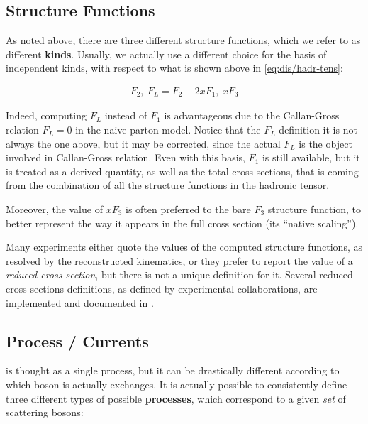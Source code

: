 \subsection{Structure Functions}

As noted above, there are three different structure functions, which we refer
to as different \textbf{kinds}.
Usually, we actually use a different choice for the basis of independent kinds,
with respect to what is shown above in \cref{eq:dis/hadr-tens}:

\begin{align}
    F_2,~ F_L = F_2 - 2xF_1,~ xF_3
\end{align}

Indeed, computing $F_L$ instead of $F_1$ is advantageous due to the Callan-Gross
relation \cite{Callan:1969uq} $F_L=0$ in the naive parton model.
Notice that the $F_L$ definition it is not always the one above, but it may be
corrected, since the actual $F_L$ is the object involved in Callan-Gross
relation.
%
Even with this basis, $F_1$ is still available, but it is treated as a derived
quantity, as well as the total cross sections, that is coming from the
combination of all the structure functions in the hadronic tensor.

Moreover, the value of $xF_3$ is often preferred to the bare $F_3$ structure
function, to better represent the way it appears in the full cross section (its
\enquote{native scaling}).

Many experiments either quote the values of the computed structure functions,
as resolved by the reconstructed kinematics, or they prefer to report the value
of a \textit{reduced cross-section}, but there is not a unique definition for
it.
Several reduced cross-sections definitions, as defined by experimental
collaborations, are implemented and documented in \yadism.

\subsection{Process / Currents}

\dis is thought as a single process, but it can be drastically different
according to which \ew boson is actually exchanges.
It is actually possible to consistently define three different types of
possible \textbf{processes}, which correspond to a given \textit{set} of
scattering bosons:

